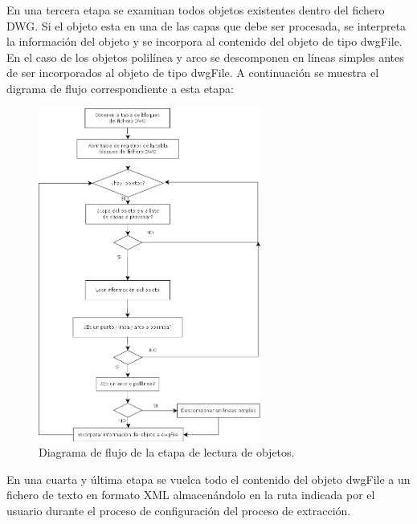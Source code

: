 \begin{itemize}
En una tercera etapa se examinan todos objetos existentes dentro del fichero DWG. Si el objeto esta en una de las capas que debe ser procesada, se interpreta la información del objeto y se incorpora al contenido del objeto de tipo dwgFile. En el caso de los objetos polilínea y arco se descomponen en líneas simples antes de ser incorporados al objeto de tipo dwgFile. A continuación se muestra el digrama de flujo correspondiente a esta etapa:

\begin{figure}[H]
\begin{center}
\includegraphics[width=0.65\textwidth]{imgs/diagramaFlujo3}
\caption{Diagrama de flujo de la etapa de lectura de objetos.}
\end{center}
\end{figure}

En una cuarta y última etapa se vuelca todo el contenido del objeto dwgFile a un fichero de texto en formato XML almacenándolo en la ruta indicada por el usuario durante el proceso de configuración del proceso de extracción.

\end{itemize}
